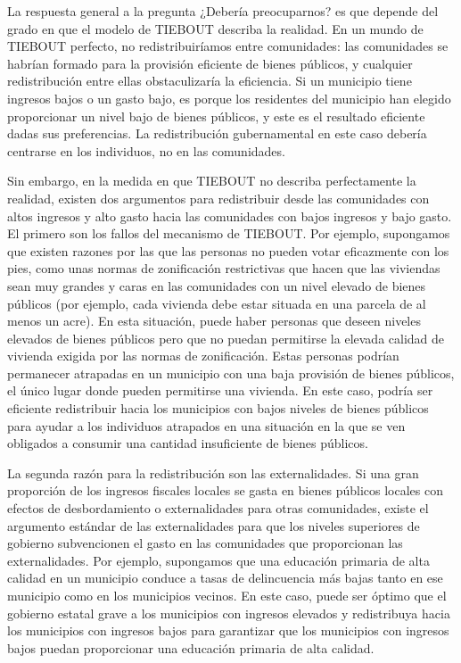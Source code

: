 \documentclass[10pt,a4paper]{article}
\begin{document}
La respuesta general a la pregunta ¿Debería preocuparnos? es que depende del grado en que el modelo de TIEBOUT describa la realidad. En un mundo de TIEBOUT perfecto, no redistribuiríamos entre comunidades: las comunidades se habrían formado para la provisión eficiente de bienes públicos, y cualquier redistribución entre ellas obstaculizaría la eficiencia. Si un municipio tiene ingresos bajos o un gasto bajo, es porque los residentes del municipio han elegido proporcionar un nivel bajo de bienes públicos, y este es el resultado eficiente dadas sus preferencias. La redistribución gubernamental en este caso debería centrarse en los individuos, no en las comunidades.

Sin embargo, en la medida en que TIEBOUT no describa perfectamente la realidad, existen dos argumentos para redistribuir desde las comunidades con altos ingresos y alto gasto hacia las comunidades con bajos ingresos y bajo gasto. El primero son los fallos del mecanismo de TIEBOUT. Por ejemplo, supongamos que existen razones por las que las personas no pueden votar eficazmente con los pies, como unas normas de zonificación restrictivas que hacen que las viviendas sean muy grandes y caras en las comunidades con un nivel elevado de bienes públicos (por ejemplo, cada vivienda debe estar situada en una parcela de al menos un acre). En esta situación, puede haber personas que deseen niveles elevados de bienes públicos pero que no puedan permitirse la elevada calidad de vivienda exigida por las normas de zonificación. Estas personas podrían permanecer atrapadas en un municipio con una baja provisión de bienes públicos, el único lugar donde pueden permitirse una vivienda. En este caso, podría ser eficiente redistribuir hacia los municipios con bajos niveles de bienes públicos para ayudar a los individuos atrapados en una situación en la que se ven obligados a consumir una cantidad insuficiente de bienes públicos.

La segunda razón para la redistribución son las externalidades. Si una gran proporción de los ingresos fiscales locales se gasta en bienes públicos locales con efectos de desbordamiento o externalidades para otras comunidades, existe el argumento estándar de las externalidades para que los niveles superiores de gobierno subvencionen el gasto en las comunidades que proporcionan las externalidades. Por ejemplo, supongamos que una educación primaria de alta calidad en un municipio conduce a tasas de delincuencia más bajas tanto en ese municipio como en los municipios vecinos. En este caso, puede ser óptimo que el gobierno estatal grave a los municipios con ingresos elevados y redistribuya hacia los municipios con ingresos bajos para garantizar que los municipios con ingresos bajos puedan proporcionar una educación primaria de alta calidad.
\end{document}
